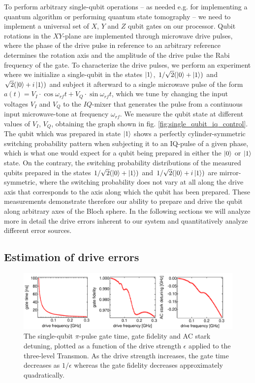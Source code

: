 To perform arbitrary single-qubit operations -- as needed e.g. for implementing a quantum algorithm or performing quantum state tomography -- we need to implement a universal set of $X$, $Y$ and $Z$ qubit gates on our processor. Qubit rotations in the $XY$-plane are implemented through microwave drive pulses, where the phase of the drive pulse in reference to an arbitrary reference determines the rotation axis and the amplitude of the drive pulse the Rabi frequency of the gate. To characterize the drive pulses, we perform an experiment where we initialize a single-qubit in the states $\left| 1 \right>$, $1/\sqrt{2}(\left| 0 \right>+\left| 1 \right>)$ and $\sqrt{2}(\left| 0 \right>+i\left| 1 \right>)$ and subject it afterward to a single microwave pulse of the form $a(t) = V_I\cdot\cos{\omega_{rf}t}+V_Q\cdot\sin{\omega_{rf}t}$, which we tune by changing the input voltages $V_I$ and $V_Q$ to the $IQ$-mixer that generates the pulse from a continuous input microwave-tone at frequency $\omega_{rf}$. We measure the qubit state at different values of $V_I$, $V_Q$, obtaining the graph shown in fig. \ref{fig:single_qubit_iq_control}. The qubit which was prepared in state $\left| 1 \right>$ shows a perfectly cylinder-symmetric switching probability pattern when subjecting it to an IQ-pulse of a given phase, which is what one would expect for a qubit being prepared in either the $\left| 0 \right>$ or $\left| 1 \right>$ state. On the contrary, the switching probability distributions of the measured qubits prepared in the states $1/\sqrt{2}(\left| 0 \right>+\left| 1 \right>)$ and $1/\sqrt{2}(\left| 0 \right>+i\left| 1 \right>)$ are mirror-symmetric, where the switching probability does not vary at all along the drive axis that corresponds to the axis along which the qubit has been prepared. These measurements demonstrate therefore our ability to prepare and drive the qubit along arbitrary axes of the Bloch sphere. In the following sections we will analyze more in detail the drive errors inherent to our system and quantitatively analyze different error sources. 

\subsection{Estimation of drive errors}

\begin{figure}[htp!]
	\centering
	\includegraphics[width=\textwidth]{"./material/mathematica/three_level_driving_errors"}
	\caption[Single-qubit $\pi$-pulse gate time, gate fidelity and AC stark detuning as a function of drive strength]{The single-qubit $\pi$-pulse gate time, gate fidelity and AC stark detuning, plotted as a function of the drive strength $\epsilon$ applied to the three-level Transmon. As the drive strength increases, the gate time decreases as $1/\epsilon$ whereas the gate fidelity decreases approximately quadratically.}
	\label{fig:three_level_driving_errors}
\end{figure}

